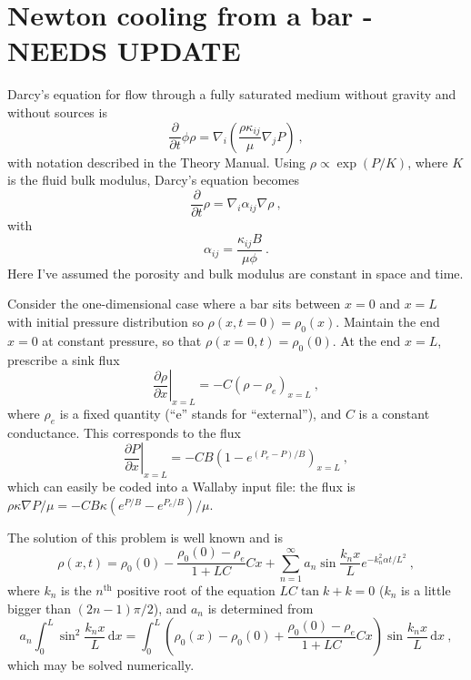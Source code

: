 \documentclass[]{scrreprt}
\begin{document}
\chapter{Newton cooling from a bar - NEEDS UPDATE}

Darcy's equation for flow through a fully saturated medium without
gravity and without sources is 
\begin{equation}
\frac{\partial}{\partial t}\phi\rho = \nabla_{i}\left(\frac{\rho
  \kappa_{ij}}{\mu} \nabla_{j}P \right) \ ,
\end{equation}
with notation described in the Theory Manual.  Using $\rho \propto
\exp(P/K)$, where $K$ is the fluid bulk modulus, Darcy's equation
becomes
\begin{equation}
\frac{\partial}{\partial t}\rho = \nabla_{i}\alpha_{ij}\nabla\rho \ ,
\end{equation}
with 
\begin{equation}
\alpha_{ij} = \frac{\kappa_{ij}B}{\mu\phi} \ .
\end{equation}
Here I've assumed the porosity and bulk modulus are constant in space
and time.

Consider the one-dimensional case where a bar sits between $x=0$ and
$x=L$ with initial pressure distribution so $\rho(x,t=0) = \rho_{0}(x)$.
Maintain the end $x=0$ at constant pressure, so that $\rho(x=0, t) =
\rho_{0}(0)$.  At the end $x=L$, prescribe a sink flux
\begin{equation}
\left.\frac{\partial\rho}{\partial x}\right|_{x=L} = -C\left(\rho -
\rho_{e}\right)_{x=L} \ ,
\end{equation}
where $\rho_{e}$ is a fixed quantity (``e'' stands for ``external''),
and $C$ is a constant conductance.  This corresponds to the flux
\begin{equation}
\left.\frac{\partial P}{\partial x}\right|_{x=L} = -CB\left(1 -
e^{(P_{e}-P)/B}\right)_{x=L} \ ,
\end{equation}
which can easily be coded into a Wallaby input file: the flux is
$\rho\kappa\nabla P/\mu = -CB\kappa(e^{P/B} - e^{P_{e}/B})/\mu$.

The solution of this problem is well known and is
\begin{equation}
\rho(x, t) = \rho_{0}(0) - \frac{\rho_{0}(0) - \rho_{e}}{1 + LC}Cx +
\sum_{n=1}^{\infty} a_{n}\sin \frac{k_{n}x}{L}e^{-k_{n}^{2}\alpha
  t/L^{2}} \ ,
\end{equation}
where $k_{n}$ is the $n^{\mathrm{th}}$ positive root of the equation
$LC\tan k + k=0$  ($k_{n}$ is a little bigger than
$(2n-1)\pi/2$), and $a_{n}$ is determined from
\begin{equation}
a_{n}\int_{0}^{L}\sin^{2}\frac{k_{n}x}{L}\,\mathrm{d}x =
\int_{0}^{L}\left(\rho_{0}(x) - \rho_{0}(0) + \frac{\rho_{0}(0) -
  \rho_{e}}{1 + LC}Cx\right)\sin \frac{k_{n}x}{L}\,\mathrm{d}x \ ,
\end{equation}
which may be solved numerically.
\end{document}
